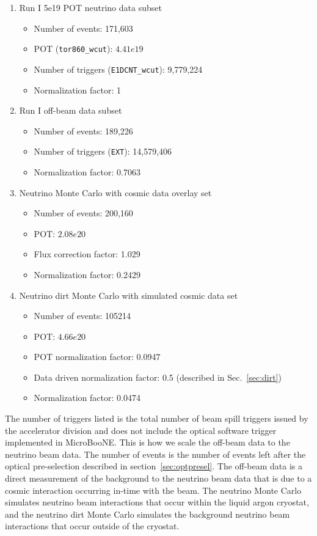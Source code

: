    \begin{enumerate}
      \item Run I 5e19 POT neutrino data subset
      \begin{itemize}
        \item Number of events: 171,603
        \item POT (\texttt{tor860\_wcut}): $4.41e19$
        \item Number of triggers (\texttt{E1DCNT\_wcut}): 9,779,224
        \item Normalization factor: 1
      \end{itemize}
      \item Run I off-beam data subset
      \begin{itemize}
        \item Number of events: 189,226
        \item Number of triggers (\texttt{EXT}): 14,579,406
        \item Normalization factor: 0.7063
      \end{itemize}
      \item Neutrino Monte Carlo with cosmic data overlay set
      \begin{itemize}
        \item Number of events: 200,160
        \item POT: $2.08e20$
        \item Flux correction factor: 1.029
        \item Normalization factor: 0.2429
      \end{itemize}
    \item Neutrino dirt Monte Carlo with simulated cosmic data set
      \begin{itemize}
        \item Number of events: 105214
        \item POT: $4.66e20$
        \item POT normalization factor: 0.0947
        \item Data driven normalization factor: 0.5 (described in Sec.~\ref{sec:dirt})
        \item Normalization factor: 0.0474
      \end{itemize}
    \end{enumerate}
    The number of triggers listed is the total number of beam spill triggers
    issued by the accelerator division and does not include the optical
    software trigger implemented in MicroBooNE.  This is how we scale the
    off-beam data to the neutrino beam data. The number of events is the number
    of events left after the optical pre-selection described in
    section~\ref{sec:optpresel}. The off-beam data is a direct measurement of
    the background to the neutrino beam data that is due to a cosmic
    interaction occurring in-time with the beam. The neutrino Monte Carlo
    simulates neutrino beam interactions that occur within the liquid argon
    cryostat, and the neutrino dirt Monte Carlo simulates the background
    neutrino beam interactions that occur outside of the cryostat.
    
